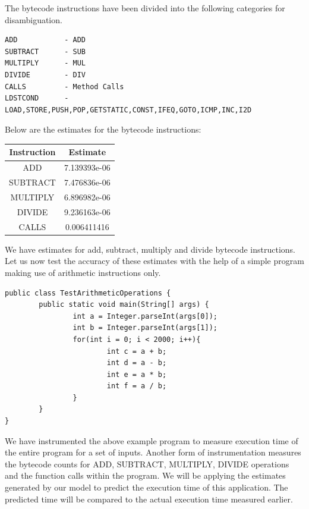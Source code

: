\documentclass[11pt]{article}
\begin{document}
The bytecode instructions have been divided into the following categories for disambiguation.
\begin{lstlisting}
ADD           - ADD
SUBTRACT      - SUB
MULTIPLY      - MUL
DIVIDE        - DIV
CALLS         - Method Calls
LDSTCOND      - LOAD,STORE,PUSH,POP,GETSTATIC,CONST,IFEQ,GOTO,ICMP,INC,I2D
\end{lstlisting}

Below are the estimates for the bytecode instructions:\\
\begin{center}
\begin{tabular}{|c|c|}
\hline
Instruction&Estimate\\
\hline
ADD&7.139393e-06\\
SUBTRACT&7.476836e-06\\
MULTIPLY&6.896982e-06\\
DIVIDE&9.236163e-06\\
CALLS&0.006411416\\
\hline
\end{tabular}
\end{center}

We have estimates for add, subtract, multiply and divide bytecode instructions. Let us now test the accuracy of these estimates with the help of a simple program making use of arithmetic instructions only.\newline

\singlespacing
\begin{lstlisting}
public class TestArithmeticOperations {
        public static void main(String[] args) {
                int a = Integer.parseInt(args[0]);
                int b = Integer.parseInt(args[1]);
                for(int i = 0; i < 2000; i++){
                        int c = a + b;
                        int d = a - b;
                        int e = a * b;
                        int f = a / b;
                }
        }
}
\end{lstlisting}

We have instrumented the above example program to measure execution time of the entire program for a set of inputs. Another form of instrumentation measures the bytecode counts for ADD, SUBTRACT, MULTIPLY, DIVIDE operations and the function calls within the program. We will be applying the estimates generated by our model to predict the execution time of this application. The predicted time will be compared to the actual execution time measured earlier.\newline
\end{document}
